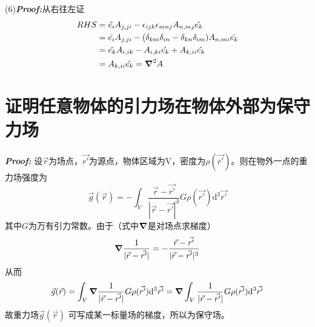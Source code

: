 \documentclass{article}
\begin{document}
(6)\textbf{\it Proof:}从右往左证
\begin{align*}
    RHS & = \hat{e_i} A_{j,ji} - \epsilon_{ijk} \epsilon_{mnj} A_{n,mj} \hat{e_k} \\
    & = \hat{e_i} A_{j,ji} - (\delta_{km}\delta_{in} - \delta_{kn}\delta_{im}) A_{n,mi} \hat{e_k}\\
    & = \hat{e_k} A_{i,ik} - A_{i,ki} \hat{e_k} + A_{k,ii} \hat{e_k} \\
    & = A_{k,ii} \hat{e_k} = \grad^2 A
\end{align*}

\section{证明任意物体的引力场在物体外部为保守力场}
\textbf{\it Proof:} 设$\vec{r}$为场点，$\vec{r'}$为源点，物体区域为V，密度为$\rho(\vec{r'})$。则在物外一点的重力场强度为
\begin{equation*}
    \vec{g}(\vec{r}) = -\int_{V} \frac{\vec{r}-\vec{r'} }{|\vec{r}-\vec{r'}|^3} G\rho(\vec{r'})\mathrm{d^3} \vec{r'}
\end{equation*}
其中$G$为万有引力常数。由于（式中$\grad$是对场点求梯度）
\[
\grad \frac{1}{|\vec{r}-\vec{r'}|} = -\frac{\vec{r}-\vec{r'} }{|\vec{r}-\vec{r'}|^3}
\]
从而
\begin{equation*}
    \vec{g}(\vec{r}) = \int_{V} \grad \frac{1}{|\vec{r}-\vec{r'}|} G\rho(\vec{r'})\mathrm{d^3} \vec{r'} = \grad \int_{V}  \frac{1}{|\vec{r}-\vec{r'}|} G\rho(\vec{r'})\mathrm{d^3} \vec{r'}
\end{equation*}
故重力场$\vec{g}(\vec{r})$ 可写成某一标量场的梯度，所以为保守场。
\end{document}
